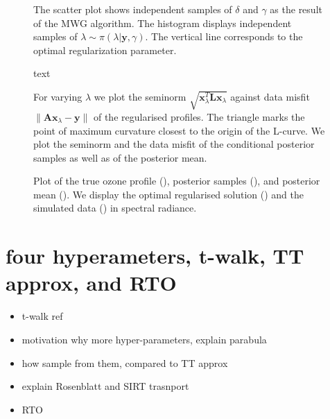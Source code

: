\begin{figure}[!ht]
	\centering
	\renewcommand\sffamily{}
	\renewcommand{\mathbf}{\bm}
	\scalebox{0.66}{}
	\caption{The scatter plot shows independent samples of $\delta$ and $\gamma$ as the result of the MWG algorithm.
		The histogram displays independent samples of $\lambda \sim \pi(\lambda | \bm{y}, \gamma)$.
		The vertical line corresponds to the optimal regularization parameter.}
	\label{fig:AllHistRes}
\end{figure}
\begin{figure}[h]
	\centering
	\scalebox{0.66}{}
	\caption[]{text}
	\label{fig:Results}
\end{figure}



\begin{figure}[!ht]
	\centering
	\renewcommand\sffamily{}
	\renewcommand{\mathbf}{\bm}
	\scalebox{0.66}{}
	\caption{For varying $\lambda$ we plot the seminorm $\sqrt{\bm{x}_\lambda^T\mathbf{L} \bm{x}_\lambda}$ against data misfit $\lVert \bm{Ax}_\lambda - \bm{y} \rVert$ of the regularised profiles.
		The triangle marks the point of maximum curvature closest to the origin of the L-curve.
		We plot the seminorm and the data misfit of the conditional posterior samples as well as of the posterior mean.}
	\label{fig:RegCurv}
\end{figure}

\begin{figure}[h]
	\centering
	\renewcommand\sffamily{}
	\renewcommand{\mathbf}{\bm}
	\scalebox{0.66}{}
	\caption{Plot of the true ozone profile (), posterior samples (), and posterior mean (). We display the optimal regularised solution () and the simulated data () in spectral radiance.}
	\label{fig:Results}
\end{figure}



\section{four hyperameters, t-walk, TT approx, and RTO}

\begin{itemize}
	\item t-walk ref
	\item motivation why more hyper-parameters, explain parabula
	\item how sample from them, compared to TT approx
	\item explain Rosenblatt and SIRT trasnport
	\item RTO
\end{itemize}


